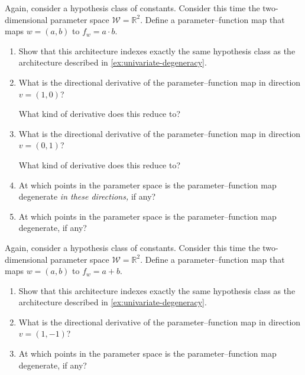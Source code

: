 \documentclass[11pt]{article}
\newcommand{\R}{\mathbb{R}}
\newcommand{\W}{\mathcal{W}}
\begin{document}
\begin{exercise}
\label{ex:product-degeneracy}
Again, consider a hypothesis class of constants. Consider this time the two-dimensional parameter space $\W = \R^2$. Define a parameter--function map that maps $w = (a, b)$ to $f_w = a \cdot b$.
\begin{enumerate}
    \item
        Show that this architecture indexes exactly the same hypothesis class
        as the architecture described in \cref{ex:univariate-degeneracy}.
    \item
        What is the directional derivative of the parameter--function map in
        direction $v = (1, 0)$?
        \begin{hint}
What kind of derivative does this reduce to?
        \end{hint}
    \item
        What is the directional derivative of the parameter--function map in
        direction $v = (0, 1)$?
        \begin{hint}
What kind of derivative does this reduce to?
        \end{hint}
    \item \label{ex:product-degeneracy:axes-directions}
        At which points in the parameter space is the parameter--function map
        degenerate \emph{in these directions,} if any?
    \item
        At which points in the parameter space is the parameter--function map
        degenerate, if any?
\end{enumerate}
\end{exercise}

\begin{exercise}
\label{ex:sum-degeneracy}
Again, consider a hypothesis class of constants. Consider this time the two-dimensional parameter space $\W = \R^2$. Define a parameter--function map that maps $w = (a, b)$ to $f_w = a + b$.
\begin{enumerate}
    \item Show that this architecture indexes exactly the same hypothesis class as the architecture described in \cref{ex:univariate-degeneracy}.
    \item What is the directional derivative of the parameter--function map in
        direction $v = (1, -1)$?
    \item At which points in the parameter space is the parameter--function map degenerate, if any?
\end{enumerate}
\end{exercise}
\end{document}
